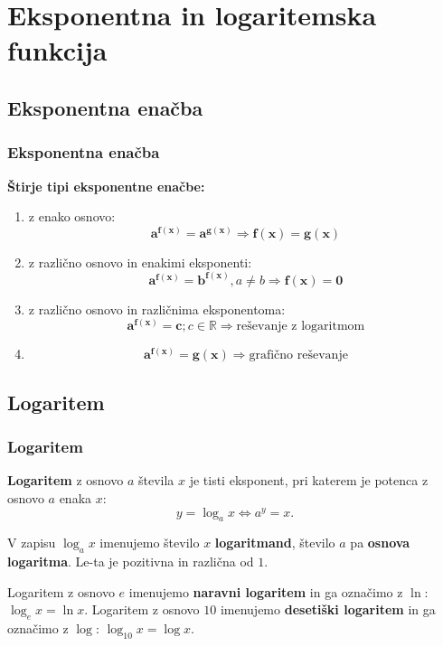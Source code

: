 \section{Eksponentna in logaritemska funkcija}

\begin{frame}
    \sectionpage
\end{frame}

\begin{frame}
\end{frame}

    \subsection{Eksponentna enačba}

        \begin{frame}
            \frametitle{Eksponentna enačba}

            \textbf{Štirje tipi eksponentne enačbe:}
            \begin{enumerate}
                \item z enako osnovo: $$\mathbf{a^{f(x)}=a^{g(x)}} \Rightarrow \mathbf{f(x)=g(x)}$$
                \item z različno osnovo in enakimi eksponenti:  $$\mathbf{a^{f(x)}=b^{f(x)}}, a\neq b \Rightarrow \mathbf{f(x)=0}$$
                \item z različno osnovo in različnima eksponentoma: $$\mathbf{a^{f(x)}=c}; c\in\mathbb{R} \Rightarrow \textrm{reševanje z logaritmom}$$
                \item $$\mathbf{a^{f(x)}=g(x)} \Rightarrow \textrm{grafično reševanje}$$
            \end{enumerate}

        \end{frame}

    \subsection{Logaritem}

        \begin{frame}
            \frametitle{Logaritem}

            \textbf{Logaritem} z osnovo $a$ števila $x$ je tisti eksponent, pri katerem je potenca z osnovo $a$ enaka $x$: $$y=\log_ax \Leftrightarrow a^y=x.$$

            V zapisu $\log_ax$ imenujemo število $x$ \textbf{logaritmand}, število $a$ pa \textbf{osnova logaritma}. Le-ta je pozitivna in različna od $1$.

            Logaritem z osnovo $e$ imenujemo \textbf{naravni logaritem} in ga označimo z $\ln$: $\log_ex=\ln x$.
            Logaritem z osnovo $10$ imenujemo \textbf{desetiški logaritem} in ga označimo z $\log$: $\log_{10}x=\log x$.

        \end{frame}


